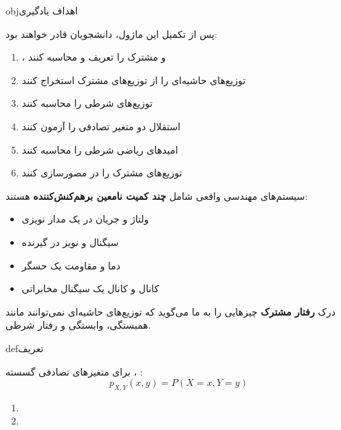 \begin{PSbox}[unbreakable]{obj}{اهداف یادگیری}

پس از تکمیل این ماژول، دانشجویان قادر خواهند بود:

\begin{enumerate}
\def\labelenumi{\arabic{enumi}.}
\tightlist
\item
  ،  و  مشترک را تعریف و محاسبه کنند
\item
  توزیع‌های حاشیه‌ای را از توزیع‌های مشترک استخراج کنند
\item
  توزیع‌های شرطی را محاسبه کنند
\item
  استقلال دو متغیر تصادفی را آزمون کنند
\item
  امیدهای ریاضی شرطی را محاسبه کنند
\item
  توزیع‌های مشترک را در  مصورسازی کنند
\end{enumerate}

\end{PSbox}


سیستم‌های مهندسی واقعی شامل \textbf{چند کمیت نامعین برهم‌کنش‌کننده} هستند:

\begin{itemize}
\tightlist
\item
  ولتاژ و جریان در یک مدار نویزی
\item
  سیگنال و نویز در گیرنده
\item
  دما و مقاومت یک حسگر
\item
  کانال  و کانال  یک سیگنال مخابراتی
\end{itemize}

درک \textbf{رفتار مشترک} چیزهایی را به ما می‌گوید که توزیع‌های حاشیه‌ای نمی‌توانند  مانند همبستگی، وابستگی و رفتار شرطی.


\begin{PSbox}[unbreakable]{def}{تعریف}

برای متغیرهای تصادفی گسسته ، :\PSbr{}\[p_{X,Y}(x,y) = P(X = x, Y = y)\]

\end{PSbox}


\begin{enumerate}
\def\labelenumi{\arabic{enumi}.}
\tightlist
\item
\item
\end{enumerate}


